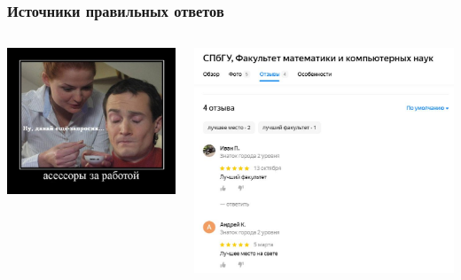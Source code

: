 \documentclass[fullscreen=true, bookmarks=true, hyperref={pdfencoding=unicode}]{beamer}
\begin{document}
\begin{frame}
  \frametitle{Источники правильных ответов}

  \begin{columns}
      \begin{column}{.5\paperwidth}
        \begin{center}
          \includegraphics[keepaspectratio,
                           width=.45\paperwidth]{asessor-yandex.jpg}
        \end{center}
      \end{column}
      \begin{column}{.5\paperwidth}
        \begin{center}
          \includegraphics[keepaspectratio,
                           width=.45\paperwidth]{department_review.jpg}
        \end{center}
      \end{column}
  \end{columns}

\end{frame}
\end{document}
